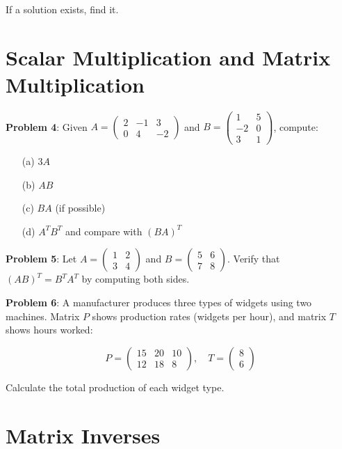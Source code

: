 \documentclass[11pt]{article}
\begin{document}
If a solution exists, find it.

\section{Scalar Multiplication and Matrix Multiplication}

\textbf{Problem 4}: Given $A = \begin{pmatrix} 2 & -1 & 3 \\ 0 & 4 & -2 \end{pmatrix}$ and $B = \begin{pmatrix} 1 & 5 \\ -2 & 0 \\ 3 & 1 \end{pmatrix}$, compute:

\begin{enumerate}
\item[(a)] $3A$
\item[(b)] $AB$
\item[(c)] $BA$ (if possible)
\item[(d)] $A^T B^T$ and compare with $(BA)^T$
\end{enumerate}

\textbf{Problem 5}: Let $A = \begin{pmatrix} 1 & 2 \\ 3 & 4 \end{pmatrix}$ and $B = \begin{pmatrix} 5 & 6 \\ 7 & 8 \end{pmatrix}$. Verify that $(AB)^T = B^T A^T$ by computing both sides.

\textbf{Problem 6}: A manufacturer produces three types of widgets using two machines. Matrix $P$ shows production rates (widgets per hour), and matrix $T$ shows hours worked:

$$P = \begin{pmatrix} 15 & 20 & 10 \\ 12 & 18 & 8 \end{pmatrix}, \quad T = \begin{pmatrix} 8 \\ 6 \end{pmatrix}$$

Calculate the total production of each widget type.

\section{Matrix Inverses}
\end{document}
